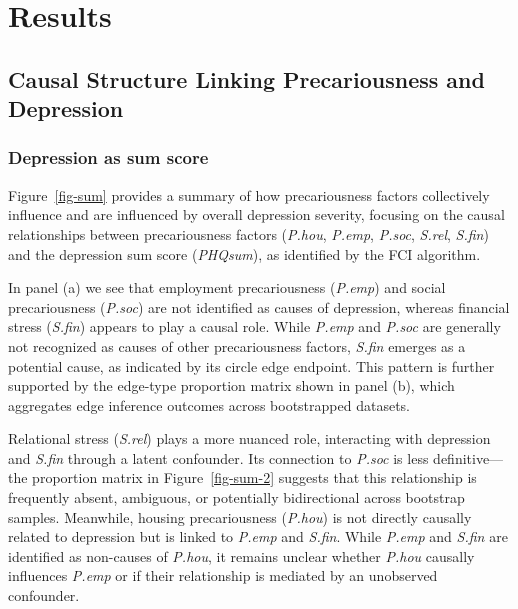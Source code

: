\documentclass[
]{article}
\begin{document}
\section{Results}\label{results}

\subsection{Causal Structure Linking Precariousness and
Depression}\label{causal-structure-linking-precariousness-and-depression}

\subsubsection{Depression as sum score}\label{depression-as-sum-score}

Figure~\ref{fig-sum} provides a summary of how precariousness factors
collectively influence and are influenced by overall depression
severity, focusing on the causal relationships between precariousness
factors (\emph{P.hou}, \emph{P.emp}, \emph{P.soc}, \emph{S.rel},
\emph{S.fin}) and the depression sum score (\emph{PHQsum}), as
identified by the FCI algorithm.

In panel (a) we see that employment precariousness (\emph{P.emp}) and
social precariousness (\emph{P.soc}) are not identified as causes of
depression, whereas financial stress (\emph{S.fin}) appears to play a
causal role. While \emph{P.emp} and \emph{P.soc} are generally not
recognized as causes of other precariousness factors, \emph{S.fin}
emerges as a potential cause, as indicated by its circle edge endpoint.
This pattern is further supported by the edge-type proportion matrix
shown in panel (b), which aggregates edge inference outcomes across
bootstrapped datasets.

Relational stress (\emph{S.rel}) plays a more nuanced role, interacting
with depression and \emph{S.fin} through a latent confounder. Its
connection to \emph{P.soc} is less definitive---the proportion matrix in
Figure~\ref{fig-sum-2} suggests that this relationship is frequently
absent, ambiguous, or potentially bidirectional across bootstrap
samples. Meanwhile, housing precariousness (\emph{P.hou}) is not
directly causally related to depression but is linked to \emph{P.emp}
and \emph{S.fin}. While \emph{P.emp} and \emph{S.fin} are identified as
non-causes of \emph{P.hou}, it remains unclear whether \emph{P.hou}
causally influences \emph{P.emp} or if their relationship is mediated by
an unobserved confounder.
\end{document}
